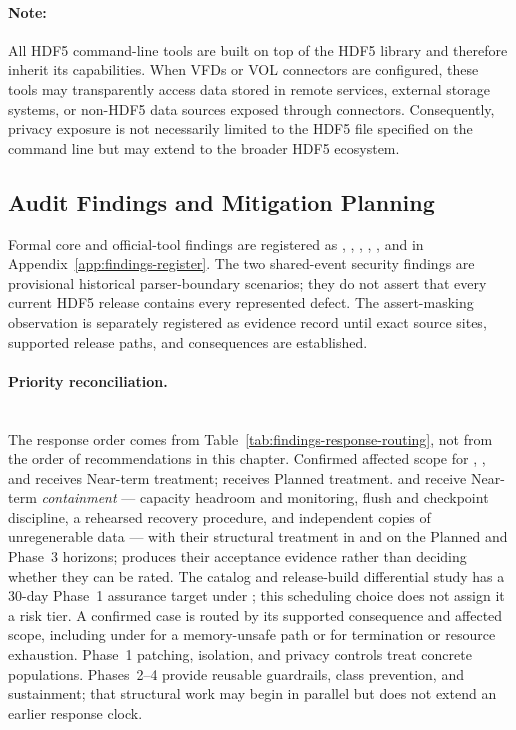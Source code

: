 \documentclass[../main.tex]{subfiles}
\begin{document}
\paragraph{Note:} All HDF5 command-line tools are built on top of the HDF5 library 
and therefore inherit its capabilities. When VFDs or VOL connectors are configured, these 
tools may transparently access data stored in remote services, external storage systems, 
or non-HDF5 data sources exposed through connectors. Consequently, privacy exposure 
is not necessarily limited to the HDF5 file specified on the command line but may extend to 
the broader HDF5 ecosystem.
\subsection{Audit Findings and Mitigation Planning}

Formal core and official-tool findings are registered as
, , ,
, , and  in
Appendix~\ref{app:findings-register}. The two shared-event security findings
are provisional historical parser-boundary scenarios; they do not assert that
every current HDF5 release contains every represented defect.
The assert-masking observation is separately registered as evidence record
 until exact source sites, supported release paths, and
consequences are established.

\paragraph{Priority reconciliation.}\mbox{}\\
The response order comes from Table~\ref{tab:findings-response-routing}, not
from the order of recommendations in this chapter. Confirmed affected scope for
, , and  receives
Near-term treatment;  receives Planned treatment.  and
 receive Near-term \emph{containment} --- capacity
headroom and monitoring, flush and checkpoint discipline, a rehearsed recovery
procedure, and independent copies of unregenerable data --- with their
structural treatment in  and  on the
Planned and Phase~3 horizons;  produces their acceptance evidence
rather than deciding whether they can be rated. The  catalog and
release-build differential study has a 30-day Phase~1 assurance target under
; this scheduling choice does not assign it a risk tier. A
confirmed case is routed by its supported consequence and affected scope,
including under  for a memory-unsafe path or
 for termination or resource exhaustion. Phase~1 patching,
isolation, and privacy controls treat concrete populations. Phases~2--4 provide
reusable guardrails, class prevention, and sustainment; that structural work
may begin in parallel but does not extend an earlier response clock.
\end{document}

